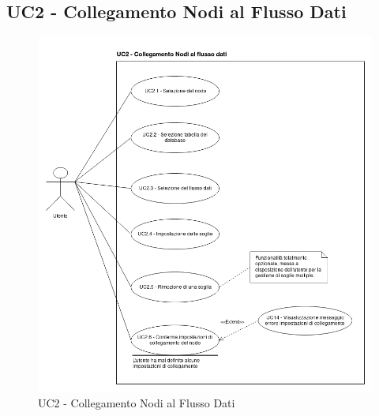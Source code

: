 \subsection{UC2 - Collegamento Nodi al Flusso Dati}\label{UC2}
\begin{figure}[H]
\centering
\includegraphics[scale=0.5]{./images/UC2.png}
\caption{UC2 - Collegamento Nodi al Flusso Dati}
\end{figure}

